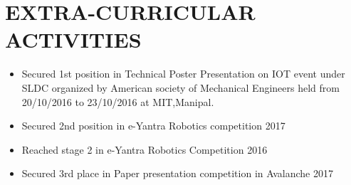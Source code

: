 \documentclass[paper=a4,fontsize=11pt]{scrartcl}
\newcommand{\NewPart}[1]{\section*{\uppercase{#1}}}
\begin{document}
\NewPart{Extra-Curricular Activities}
\begin{itemize}
\item Secured 1st position in Technical Poster Presentation on IOT event under
SLDC organized by American society of Mechanical Engineers held from
20/10/2016 to 23/10/2016 at MIT,Manipal.
\item Secured 2nd position in e-Yantra Robotics competition 2017
\item Reached stage 2 in e-Yantra Robotics Competition 2016
\item Secured 3rd place in Paper presentation competition in Avalanche 2017
\end{itemize}
\end{document}
